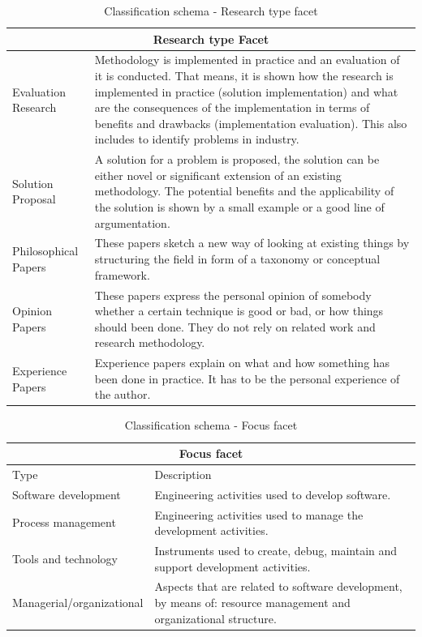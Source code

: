 \documentclass[final,5p,times,twocolumn]{elsarticle}
\begin{document}
\onecolumn
\begin{table}[H]
\renewcommand{\arraystretch}{1.1}
\centering
\scriptsize  
\begin{tabular}{|p{1.35in}|p{3.85in}|}
\hline 
\hline  
\multicolumn{2}{|c|}{\textbf{Research type Facet}} \\
 \hline  
 
Evaluation Research & Methodology is implemented in practice and an evaluation of it is conducted. That means, it is shown how the research is implemented in practice (solution implementation) and what are the consequences of the implementation in terms of benefits and drawbacks (implementation evaluation). This also includes to identify problems in industry. \\ 
Solution Proposal & A solution for a problem is proposed, the solution can be either novel or significant extension of an existing methodology. The potential benefits and the applicability of the solution is shown by a small example or a good line of argumentation.  \\   
Philosophical Papers & These papers sketch a new way of looking at existing things by structuring the field in form of a taxonomy or conceptual framework. \\ 
Opinion Papers & These papers express the personal opinion of somebody whether a certain technique is good or bad, or how things should been done. They do not rely on related work and research methodology. \\ 
Experience Papers & Experience papers explain on what and how something has been done in practice. It has to be the personal experience of the author. \\

\hline \hline 
 \end{tabular}
 \caption{Classification schema - Research type facet}
\label{tab:ms:class-schema-res}
\end{table}
\small




\begin{table}[H]
\renewcommand{\arraystretch}{1.1}
\centering
\scriptsize 
\begin{tabular}{|p{1.35in}|p{3.85in}|}
\hline \hline
\multicolumn{2}{|c|}{\textbf{Focus facet}} \\
\hline  
  Type &	Description \\
\hline
Software development & Engineering activities used to develop software. \\ 
Process management & Engineering activities used to manage the development activities. \\ 
Tools and technology & Instruments used to create, debug, maintain and support development activities. \\ 
Managerial/organizational & Aspects that are related to software development, by means of: resource management and organizational structure. \\ 
\hline \hline
 \end{tabular}
 \caption{Classification schema - Focus facet}
\label{tab:ms:class-schema-focus}
\end{table}
\small
\end{document}
